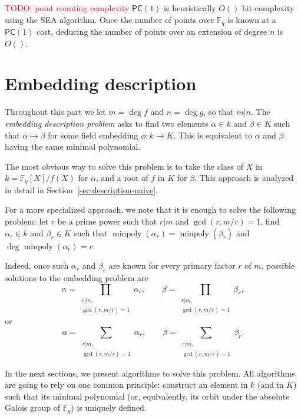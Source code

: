\documentclass[12pt]{article}
\theoremstyle{plain}
\theoremstyle{definition}
\newcommand{\todo}[1]{\textcolor{red}{TODO: #1}}
\DeclareMathOperator{\minpoly}{minpoly}
\def\F{\ensuremath{\mathbb{F}}}
\def\PC{\ensuremath{\mathsf{PC}}}
\newcounter{algorithm}
\begin{document}
\todo{point counting complexity}
$\PC(1)$ is heuristically $O()$ bit-complexity
using the SEA algorithm.
Once the number of points over $\F_q$ is known at a $\PC(1)$ cost,
deducing the number of points over an extension of degree $n$ is
$O()$.



\part{Embedding description}

Throughout this part we let $m=\deg f$ and $n=\deg g$, so that
$m|n$. The \emph{embedding description problem} asks to find two
elements $\alpha\in k$ and $\beta\in K$ such that $\alpha\mapsto\beta$
for some field embedding $\phi:k\to K$. This is equivalent to
$\alpha$ and $\beta$ having the same minimal polynomial.

The most obvious way to solve this problem is to take the class of $X$
in $k=\F_q[X]/f(X)$ for $\alpha$, and a root of $f$ in $K$ for
$\beta$. This approach is analyzed in detail in
Section~\ref{sec:description-naive}.

For a more specialized approach, we note that it is enough to solve
the following problem: let $r$ be a prime power such that $r|m$ and
$\gcd(r,m/r)=1$, find $\alpha_r\in k$ and $\beta_r\in K$ such that
$\minpoly(\alpha_r)=\minpoly(\beta_r)$ and $\deg\minpoly(\alpha_r)=r$.

Indeed, once such $\alpha_r$ and $\beta_r$ are known for every primary
factor $r$ of $m$, possible solutions to the embedding problem are
\begin{equation*}
  \alpha = \prod_{\substack{r|m,\\\gcd(r,m/r)=1}}\alpha_r,\qquad
  \beta = \prod_{\substack{r|m,\\\gcd(r,m/r)=1}}\beta_r,
\end{equation*}
or
\begin{equation*}
  \alpha = \sum_{\substack{r|m,\\\gcd(r,m/r)=1}}\alpha_r,\qquad
  \beta = \sum_{\substack{r|m,\\\gcd(r,m/r)=1}}\beta_r.
\end{equation*}

In the next sections, we present algorithms to solve this problem. All
algorithms are going to rely on one common principle: construct an
element in $k$ (and in $K$) such that its minimal polynomial (or,
equivalently, its orbit under the absolute Galois group of $\F_q$) is
uniquely defined.
\end{document}

